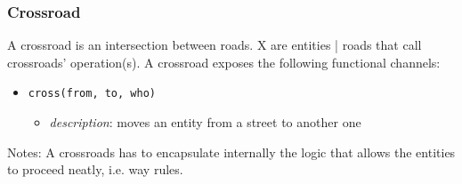 \subsubsection{Crossroad}
A crossroad is an intersection between roads.
X are entities | roads that call crossroads’ operation(s).
A crossroad exposes the following functional channels:
\begin{itemize}
	\item \texttt{cross(from, to, who)}
	\begin{itemize}
		\item \textit{description}: moves an entity from a street to another one
	\end{itemize}
\end{itemize}
Notes:
A crossroads has to encapsulate internally the logic that allows the entities to proceed neatly, i.e. way rules.